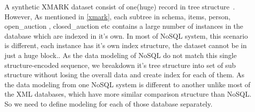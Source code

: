 A synthetic XMARK dataset consist of one(huge) record in tree structure~\cite{xmark/VIST}. However, As mentioned in \ref{xmark}, each subtree in schema, items, person, open\_auction , closed\_auction etc contains a large number of instances in the database which are indexed in it's own. In most of NoSQL system, this scenario is different, each instance has it's own index structure, the dataset cannot be in just a huge block.. As the data modeling of NoSQL do not match this single structure-encoded sequence, we breakdown it's tree structure into set of sub structure without losing the overall data and create index for each of them. As the data modeling from one NoSQL system is different to another unlike most of the XML databases, which have more similar comparison structure than NoSQL. So we need to define modeling for each of those database separately. 

